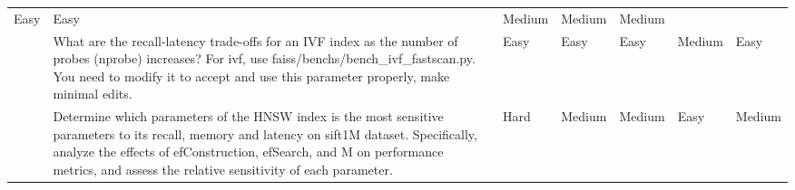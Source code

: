 \begin{table}[H]
{\begin{tabular}{p{3cm}|p{10cm}|p{5cm}|p{5cm}|p{5cm}|p{5cm}|p{1cm}}
 \multicolumn{1}{l|}{Easy} &
  \multicolumn{1}{l|}{Easy} &
  \multicolumn{1}{l|}{Medium} &
  \multicolumn{1}{l|}{Medium} &
  Medium \\ \cline{2-7} 
 &
  What are the recall-latency trade-offs for an IVF index as the number of probes (nprobe) increases? For ivf, use faiss/benchs/bench\_ivf\_fastscan.py. You need to modify it to accept and use this parameter properly, make minimal edits. &
  \multicolumn{1}{l|}{Easy} &
  \multicolumn{1}{l|}{Easy} &
  \multicolumn{1}{l|}{Easy} &
  \multicolumn{1}{l|}{Medium} &
  Easy \\ \cline{2-7} 
 &
  Determine which parameters of the HNSW index is the most sensitive parameters to its recall, memory and latency on sift1M dataset. Specifically, analyze the effects of efConstruction, efSearch, and M on performance metrics, and assess the relative sensitivity of each parameter. &
  \multicolumn{1}{l|}{Hard} &
  \multicolumn{1}{l|}{Medium} &
  \multicolumn{1}{l|}{Medium} &
  \multicolumn{1}{l|}{Easy} &
  Medium \\ \cline{2-7} 


\end{tabular}}
\end{table}
